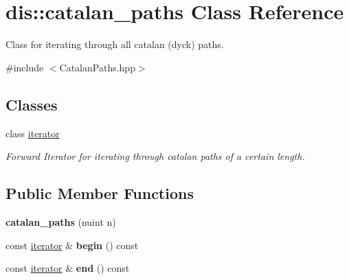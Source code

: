 \hypertarget{classdis_1_1catalan__paths}{\section{dis\-:\-:catalan\-\_\-paths Class Reference}
\label{classdis_1_1catalan__paths}
}


Class for iterating through all catalan (dyck) paths.  




{\ttfamily \#include $<$Catalan\-Paths.\-hpp$>$}

\subsection*{Classes}
\begin{DoxyCompactItemize}
\item 
class \hyperlink{classdis_1_1catalan__paths_1_1iterator}{iterator}
\begin{DoxyCompactList}\small\item\em Forward Iterator for iterating through catalan paths of a certain length. \end{DoxyCompactList}\end{DoxyCompactItemize}
\subsection*{Public Member Functions}
\begin{DoxyCompactItemize}
\item 
\hypertarget{classdis_1_1catalan__paths_a079689079c6ce54049641fa69e64972a}{{\bfseries catalan\-\_\-paths} (nuint n)}\label{classdis_1_1catalan__paths_a079689079c6ce54049641fa69e64972a}

\item 
\hypertarget{classdis_1_1catalan__paths_a4bf270d5961ae9ce73e916ed06193ecf}{const \hyperlink{classdis_1_1catalan__paths_1_1iterator}{iterator} \& {\bfseries begin} () const }\label{classdis_1_1catalan__paths_a4bf270d5961ae9ce73e916ed06193ecf}

\item 
\hypertarget{classdis_1_1catalan__paths_a4bb73e01fda6b651a8f81a77ef562f82}{const \hyperlink{classdis_1_1catalan__paths_1_1iterator}{iterator} \& {\bfseries end} () const }\label{classdis_1_1catalan__paths_a4bb73e01fda6b651a8f81a77ef562f82}

\end{DoxyCompactItemize}


